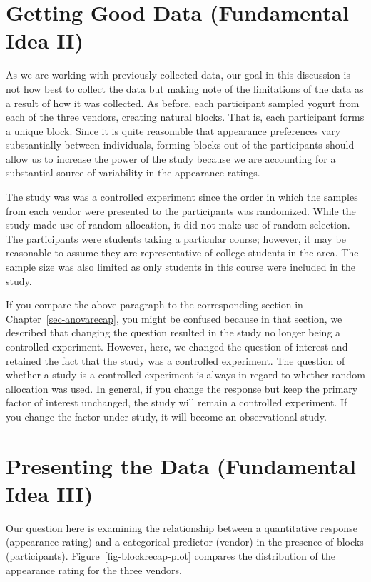 \documentclass[
  letterpaper,
  DIV=11,
  numbers=noendperiod]{scrreprt}
\theoremstyle{definition}
\theoremstyle{definition}
\theoremstyle{plain}
\theoremstyle{remark}
\begin{document}
\section{Getting Good Data (Fundamental Idea
II)}\label{getting-good-data-fundamental-idea-ii-2}

As we are working with previously collected data, our goal in this
discussion is not how best to collect the data but making note of the
limitations of the data as a result of how it was collected. As before,
each participant sampled yogurt from each of the three vendors, creating
natural blocks. That is, each participant forms a unique block. Since it
is quite reasonable that appearance preferences vary substantially
between individuals, forming blocks out of the participants should allow
us to increase the power of the study because we are accounting for a
substantial source of variability in the appearance ratings.

The study was was a controlled experiment since the order in which the
samples from each vendor were presented to the participants was
randomized. While the study made use of random allocation, it did not
make use of random selection. The participants were students taking a
particular course; however, it may be reasonable to assume they are
representative of college students in the area. The sample size was also
limited as only students in this course were included in the study.

If you compare the above paragraph to the corresponding section in
Chapter~\ref{sec-anovarecap}, you might be confused because in that
section, we described that changing the question resulted in the study
no longer being a controlled experiment. However, here, we changed the
question of interest and retained the fact that the study was a
controlled experiment. The question of whether a study is a controlled
experiment is always in regard to whether random allocation was used. In
general, if you change the response but keep the primary factor of
interest unchanged, the study will remain a controlled experiment. If
you change the factor under study, it will become an observational
study.

\section{Presenting the Data (Fundamental Idea
III)}\label{presenting-the-data-fundamental-idea-iii-2}

Our question here is examining the relationship between a quantitative
response (appearance rating) and a categorical predictor (vendor) in the
presence of blocks (participants). Figure~\ref{fig-blockrecap-plot}
compares the distribution of the appearance rating for the three
vendors.
\end{document}
